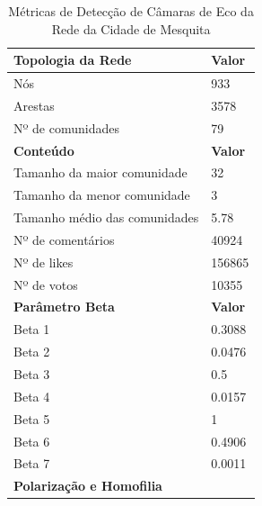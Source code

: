\begin{table}[ht]
	\centering
	\caption{Métricas de Detecção de Câmaras de Eco da Rede da Cidade de Mesquita}
	\label{tab:echo-chamber-metrics-mesquita}
	\begin{tabular}{l|l}
		\toprule
		\textbf{Topologia da Rede}          & \textbf{Valor}                   \\
		\midrule
		Nós                                 & 933                              \\
		Arestas                             & 3578                             \\
		Nº de comunidades                   & 79                               \\
		\toprule
		\textbf{Conteúdo}                   & \textbf{Valor}                   \\
		\midrule
		Tamanho da maior comunidade         & 32                               \\
		Tamanho da menor comunidade         & 3                                \\
		Tamanho médio das comunidades       & 5.78                             \\
		Nº de comentários                   & 40924                            \\
		Nº de likes                         & 156865                           \\
		Nº de votos                         & 10355                            \\
		\midrule
		\textbf{Parâmetro Beta}             & \textbf{Valor}                   \\
		\midrule
		Beta 1                              & 0.3088                           \\
		Beta 2                              & 0.0476                           \\
		Beta 3                              & 0.5                              \\
		Beta 4                              & 0.0157                           \\
		Beta 5                              & 1                                \\
		Beta 6                              & 0.4906                           \\
		Beta 7                              & 0.0011                           \\
		\midrule
		\textbf{Polarização e Homofilia}    &                                  \\

\end{tabular}
\end{table}
